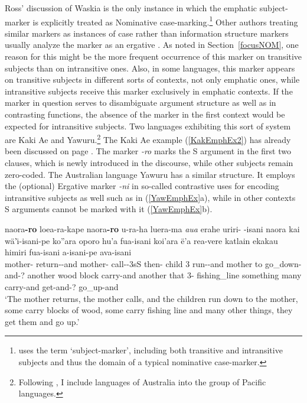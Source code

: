 \enlargethispage{\baselineskip}Ross' discussion of Waskia is the only instance in which the emphatic subject-marker is explicitly treated as Nominative case-marking.\footnote{\citet{Ross:1978} uses the term `subject-marker', including both transitive and intransitive subjects and thus the domain of a typical nominative case-marker.}
Other authors treating similar markers as instances of case rather than information structure markers usually analyze the marker as an ergative .
As noted in Section~\ref{focusNOM}, one reason for this might be the more frequent occurrence of this marker on transitive subjects than on intransitive ones. 
Also, in some languages, this marker appears on transitive subjects in different sorts of contexts, not only emphatic ones, while intransitive subjects receive this marker exclusively in emphatic contexts. 
If the marker in question serves to disambiguate argument structure as well as in contrasting functions, the absence of the marker in the first context would be expected for intransitive subjects. 
Two languages exhibiting this sort of system are Kaki Ae and Yawuru.\footnote{Following \citet{Lynch:1998}, I include languages of Australia into the group of Pacific languages.} 
The Kaki Ae example (\ref{KakEmphEx2}) has already been discussed on page \pageref{KakEmphEx1}. 
The marker \emph{-ro} marks the S argument in the first two clauses, which is newly introduced in the discourse, while other subjects remain zero-coded.
The Australian language Yawuru has a similar structure. 
It employs the (optional) Ergative marker \emph{-ni} in so-called contrastive uses for encoding intransitive subjects as well such as in (\ref{YawEmphEx}a), while in other contexts S arguments cannot be marked with it (\ref{YawEmphEx}b).
 
\begin{exe} \ex\label{KakEmphEx2}
\gll naora\textbf{-ro} loea-ra-kape naora\textbf{-ro} u-ra-ha luera-ma \emph{aua} erahe uriri-\rdp{}%
-isani naora kai w\"a'\"\i-isani-pe ko''ara oporo hu'a fua-isani koi'ara \"e'a rea-vere katlain ekakau himiri fua-isani a-isani-pe ava-isani\\
mother-\erg{} return-\irr{}-and mother-\erg{} call-\irr{}-3sS then-\loc{} child 3\pl{} run-\rdp-and mother to go\_down-and-? another wood block carry-and another that 3\sg{}-\poss{} fishing\_line something many carry-and get-and-? go\_up-and\\
\glt `The mother returns, the mother calls, and the children run down to the mother, some carry blocks of wood, some carry fishing line and many other things, they get them and go up.'
\end{exe}

